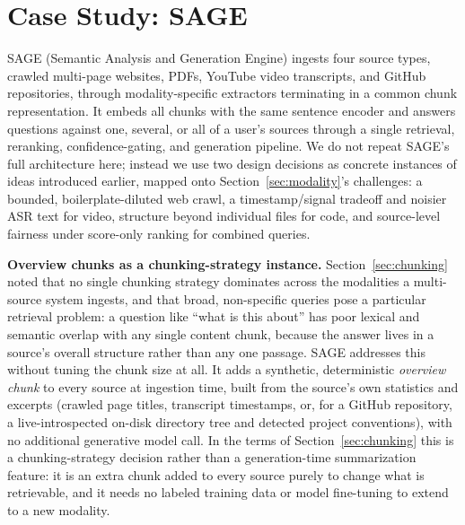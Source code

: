 \documentclass[conference]{IEEEtran}
\begin{document}
\section{Case Study: SAGE}
\label{sec:casestudy}

SAGE (Semantic Analysis and Generation Engine) ingests four source types, crawled multi-page websites, PDFs, YouTube video transcripts, and GitHub repositories, through modality-specific extractors terminating in a common chunk representation. It embeds all chunks with the same sentence encoder \cite{reimers2019sbert,wang2020minilm} and answers questions against one, several, or all of a user's sources through a single retrieval, reranking, confidence-gating, and generation pipeline. We do not repeat SAGE's full architecture here; instead we use two design decisions as concrete instances of ideas introduced earlier, mapped onto Section~\ref{sec:modality}'s challenges: a bounded, boilerplate-diluted web crawl, a timestamp/signal tradeoff and noisier ASR text for video, structure beyond individual files for code, and source-level fairness under score-only ranking for combined queries.

\textbf{Overview chunks as a chunking-strategy instance.} Section~\ref{sec:chunking} noted that no single chunking strategy dominates across the modalities a multi-source system ingests, and that broad, non-specific queries pose a particular retrieval problem: a question like ``what is this about'' has poor lexical and semantic overlap with any single content chunk, because the answer lives in a source's overall structure rather than any one passage. SAGE addresses this without tuning the chunk size at all. It adds a synthetic, deterministic \emph{overview chunk} to every source at ingestion time, built from the source's own statistics and excerpts (crawled page titles, transcript timestamps, or, for a GitHub repository, a live-introspected on-disk directory tree and detected project conventions), with no additional generative model call. In the terms of Section~\ref{sec:chunking} this is a chunking-strategy decision rather than a generation-time summarization feature: it is an extra chunk added to every source purely to change what is retrievable, and it needs no labeled training data or model fine-tuning to extend to a new modality.
\end{document}
